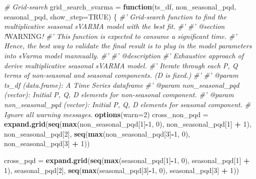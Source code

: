 \documentclass[
  11pt,
]{article}
\newenvironment{Shaded}{\begin{snugshade}}{\end{snugshade}}
\newcommand{\AlertTok}[1]{\textcolor[rgb]{0.94,0.16,0.16}{#1}}
\newcommand{\CommentTok}[1]{\textcolor[rgb]{0.56,0.35,0.01}{\textit{#1}}}
\newcommand{\ControlFlowTok}[1]{\textcolor[rgb]{0.13,0.29,0.53}{\textbf{#1}}}
\newcommand{\DataTypeTok}[1]{\textcolor[rgb]{0.13,0.29,0.53}{#1}}
\newcommand{\DecValTok}[1]{\textcolor[rgb]{0.00,0.00,0.81}{#1}}
\newcommand{\KeywordTok}[1]{\textcolor[rgb]{0.13,0.29,0.53}{\textbf{#1}}}
\newcommand{\NormalTok}[1]{#1}
\newcommand{\OperatorTok}[1]{\textcolor[rgb]{0.81,0.36,0.00}{\textbf{#1}}}
\newcommand{\OtherTok}[1]{\textcolor[rgb]{0.56,0.35,0.01}{#1}}
\newcommand{\StringTok}[1]{\textcolor[rgb]{0.31,0.60,0.02}{#1}}
\begin{document}
\begin{Shaded}
\begin{Highlighting}[]
{{{{{{{{\CommentTok{# Grid-search}
\NormalTok{grid_search_svarma =}\StringTok{ }\ControlFlowTok{function}\NormalTok{(ts_df, non_seasonal_pqd, seasonal_pqd, }\DataTypeTok{show_step=}\OtherTok{TRUE}\NormalTok{) \{}
  \CommentTok{#' Grid-search function to find the multiplicative seasonal sVARMA model with the best fit.}
  \CommentTok{#' }
  \CommentTok{#' @section !}\AlertTok{WARNING}\CommentTok{!}
  \CommentTok{#' This function is expected to consume a significant time. }
  \CommentTok{#' Hence, the best way to validate the final result is to plug in the model parameters into sVarma model mannually.}
  \CommentTok{#'}
  \CommentTok{#' @description}
  \CommentTok{#' Exhaustive approach of derive multiplicative seasonal sVARMA model.}
  \CommentTok{#' Iterate through each P, Q terms of non-seasonal and seasonal components. (D is fixed.)}
  \CommentTok{#'}
  \CommentTok{#' @param ts_df (data.frame): A Time Series dataframe}
  \CommentTok{#' @param non_seasonal_pqd (vector): Initial P, Q, D elements for non-seasonal component.}
  \CommentTok{#' @param non_seasonal_pqd (vector): Initial P, Q, D elements for seasonal component.}
  \CommentTok{# Ignore all warning messages.}
  \KeywordTok{options}\NormalTok{(}\DataTypeTok{warn=}\DecValTok{2}\NormalTok{)}
\NormalTok{  cross_non_pqd =}\StringTok{ }\KeywordTok{expand.grid}\NormalTok{(}\KeywordTok{seq}\NormalTok{(}\KeywordTok{max}\NormalTok{(non_seasonal_pqd[}\DecValTok{1}\NormalTok{]}\OperatorTok{-}\DecValTok{1}\NormalTok{, }\DecValTok{0}\NormalTok{), non_seasonal_pqd[}\DecValTok{1}\NormalTok{] }\OperatorTok{+}\StringTok{ }\DecValTok{1}\NormalTok{),}
\NormalTok{                              non_seasonal_pqd[}\DecValTok{2}\NormalTok{],}
                              \KeywordTok{seq}\NormalTok{(}\KeywordTok{max}\NormalTok{(non_seasonal_pqd[}\DecValTok{3}\NormalTok{]}\OperatorTok{-}\DecValTok{1}\NormalTok{, }\DecValTok{0}\NormalTok{), non_seasonal_pqd[}\DecValTok{3}\NormalTok{] }\OperatorTok{+}\StringTok{ }\DecValTok{1}\NormalTok{))}
  
\NormalTok{  cross_pqd =}\StringTok{ }\KeywordTok{expand.grid}\NormalTok{(}\KeywordTok{seq}\NormalTok{(}\KeywordTok{max}\NormalTok{(seasonal_pqd[}\DecValTok{1}\NormalTok{]}\OperatorTok{-}\DecValTok{1}\NormalTok{, }\DecValTok{0}\NormalTok{), seasonal_pqd[}\DecValTok{1}\NormalTok{] }\OperatorTok{+}\StringTok{ }\DecValTok{1}\NormalTok{),}
\NormalTok{                          seasonal_pqd[}\DecValTok{2}\NormalTok{],}
                          \KeywordTok{seq}\NormalTok{(}\KeywordTok{max}\NormalTok{(seasonal_pqd[}\DecValTok{3}\NormalTok{]}\OperatorTok{-}\DecValTok{1}\NormalTok{, }\DecValTok{0}\NormalTok{), seasonal_pqd[}\DecValTok{3}\NormalTok{] }\OperatorTok{+}\StringTok{ }\DecValTok{1}\NormalTok{))}
  
}}}}}}}}
\end{Highlighting}
\end{Shaded}
\end{document}
